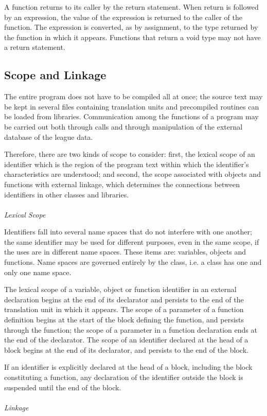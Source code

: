 \documentclass[12pt]{report}
\begin{document}
A function returns to its caller by the return statement. When return is followed by an expression, the value of the expression is returned to the caller of the function. The expression is converted, as by assignment, to the type returned by the function in which it appears. Functions that return a void type may not have a return statement.

\subsection{Scope and Linkage}

The entire program does not have to be compiled all at once; the source text may be kept in several files containing translation units and precompiled routines can be loaded from libraries. Communication among the functions of a program may be carried out both through calls and through manipulation of the external database of the league data.

Therefore, there are two kinds of scope to consider: first, the lexical scope of an identifier which is the region of the program text within which the identifier's characteristics are understood; and second, the scope associated with objects and functions with external linkage, which determines the connections between identifiers in other classes and libraries.\\
\\
\textit{Lexical Scope}

Identifiers fall into several name spaces that do not interfere with one another; the same identifier may be used for different purposes, even in the same scope, if the uses are in different name spaces. These items are: variables, objects and functions. Name spaces are governed entirely by the class, i.e. a class has one and only one name space.

The lexical scope of a variable, object or function identifier in an external declaration begins at the end of its declarator and persists to the end of the translation unit in which it appears. The scope of a parameter of a function definition begins at the start of the block defining the function, and persists through the function; the scope of a parameter in a function declaration ends at the end of the declarator. The scope of an identifier declared at the head of a block begins at the end of its declarator, and persists to the end of the block. 

If an identifier is explicitly declared at the head of a block, including the block constituting a function, any declaration of the identifier outside the block is suspended until the end of the block.\\
\\
\textit{Linkage}
\end{document}
